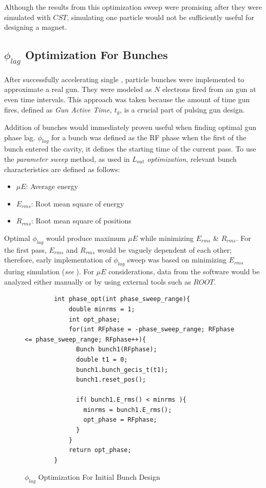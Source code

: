 \documentclass[a4paper,oneside,12pt]{report}
\numberwithin{equation}{chapter}
\begin{document}
Although the results from this optimization sweep were promising after they were simulated with $CST$, simulating one particle would not be sufficiently useful for designing a magnet.

\subsection{$\phi_{lag}$ Optimization For Bunches}
After successfully accelerating single \e, particle bunches were implemented to approximate a real \e gun. 
They were modeled as $N$ electrons fired from an \e gun at even time intervals. This approach was taken because the amount of time gun fires, defined as \textit{Gun Active Time, $t_g$}, is a crucial part of pulsing \e gun design.

Addition of bunches would immediately proven useful when finding optimal gun phase lag.
$\phi_{lag}$ for a bunch was defined as the RF phase when the first \e of the bunch entered the cavity, it defines the starting time of the current pass.
To use the \textit{parameter sweep} method, as used in \textit{$L_{out}$ optimization}, relevant bunch characteristics are defined as follows:

\begin{itemize}
    \item $\mu E$: Average energy
    \item $E_{rms}$: Root mean square of energy
    \item $R_{rms}$: Root mean square of \e positions
\end{itemize}

Optimal $\phi_{lag}$ would produce maximum $\mu E$ while minimizing $E_{rms}$ \& $R_{rms}$. For the first pass, 
$E_{rms}$ and $R_{rms}$ would be vaguely dependent of each other; therefore, early implementation of $\phi_{lag}$ sweep was based on minimizing $E_{rms}$ during simulation (\textit{see }). 
For $\mu E$ considerations, data from the software would be analyzed either manually or by using external tools such as $ROOT$. 

\begin{figure}[H]
    \centering
    \captionsetup{justification=centering}
    \begin{verbatim}
        int phase_opt(int phase_sweep_range){
            double minrms = 1;
            int opt_phase;
            for(int RFphase = -phase_sweep_range; RFphase <= phase_sweep_range; RFphase++){
              Bunch bunch1(RFphase);
              double t1 = 0;
              bunch1.bunch_gecis_t(t1);
              bunch1.reset_pos();
        
              if( bunch1.E_rms() < minrms ){
                minrms = bunch1.E_rms();
                opt_phase = RFphase;
              }
            }
            return opt_phase;
        }
    \end{verbatim}
    \caption{$\phi_{lag}$ Optimization For Initial Bunch Design}
    \label{fig:phlag_opt}
\end{figure}
\end{document}
